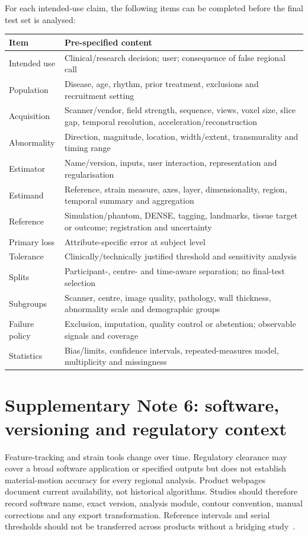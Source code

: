 \documentclass[11pt,a4paper]{article}
\begin{document}
For each intended-use claim, the following items can be completed before the final test set is analysed:

\begin{longtable}{L{0.24\textwidth}L{0.67\textwidth}}
\toprule
Item & Pre-specified content \\
\midrule
Intended use & Clinical/research decision; user; consequence of false regional call \\
Population & Disease, age, rhythm, prior treatment, exclusions and recruitment setting \\
Acquisition & Scanner/vendor, field strength, sequence, views, voxel size, slice gap, temporal resolution, acceleration/reconstruction \\
Abnormality & Direction, magnitude, location, width/extent, transmurality and timing range \\
Estimator & Name/version, inputs, user interaction, representation and regularisation \\
Estimand & Reference, strain measure, axes, layer, dimensionality, region, temporal summary and aggregation \\
Reference & Simulation/phantom, DENSE, tagging, landmarks, tissue target or outcome; registration and uncertainty \\
Primary loss & Attribute-specific error at subject level \\
Tolerance & Clinically/technically justified threshold and sensitivity analysis \\
Splits & Participant-, centre- and time-aware separation; no final-test selection \\
Subgroups & Scanner, centre, image quality, pathology, wall thickness, abnormality scale and demographic groups \\
Failure policy & Exclusion, imputation, quality control or abstention; observable signals and coverage \\
Statistics & Bias/limits, confidence intervals, repeated-measures model, multiplicity and missingness \\
\bottomrule
\end{longtable}

\section*{Supplementary Note 6: software, versioning and regulatory context}

Feature-tracking and strain tools change over time. Regulatory clearance may cover a broad software application or specified outputs but does not establish material-motion accuracy for every regional analysis. Product webpages document current availability, not historical algorithms. Studies should therefore record software name, exact version, analysis module, contour convention, manual corrections and any export transformation. Reference intervals and serial thresholds should not be transferred across products without a bridging study~\cite{lim2021,militaru2021,cao2018}.
\end{document}
